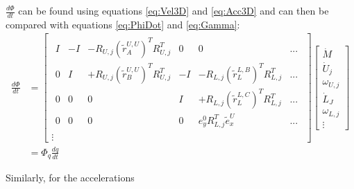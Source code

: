 $\tfrac{d\Phi}{dt}$ can be found using equations \ref{eq:Vel3D} and \ref{eq:Acc3D} and can then be compared with equations \ref{eq:PhiDot} and \ref{eq:Gamma}:
\begin{equation}
\begin{split}
    \frac{d\Phi}{dt}&=
    \begin{bmatrix}
    \begin{array}{cccccc} %
    I & -I & -R_{U,j}({\tilde r}^{U,U}_A)^T R_{U,j}^T & 0 & 0 & ... \\
    0 &  I & +R_{U,j}({\tilde r}^{U,U}_B)^T R_{U,j}^T & -I& -R_{L,j}({\tilde r}^{L,B}_L)^T R_{L,j}^T & ...\\
    0 & 0 & 0 & I & +R_{L,j}({\tilde r}^{L,C}_L)^T R_{L,j}^T & ... \\
    0 & 0 & 0 & 0 & e_{y}^0 R_{L,j}^T \tilde{e}_{x}^{U} & ... 
    \end{array}\\
    \vdots
    \end{bmatrix}
    \begin{bmatrix}
    \dot{M} \\
    \dot{U}_j \\
    \omega_{U,j} \\
    \dot{L}_J \\
    \omega_{L,j} \\
    \vdots
    \end{bmatrix} \label{eq:PhiDot3D}\\
    &=\Phi_q \tfrac{dq}{dt}
\end{split}
\end{equation}


Similarly, for the accelerations

